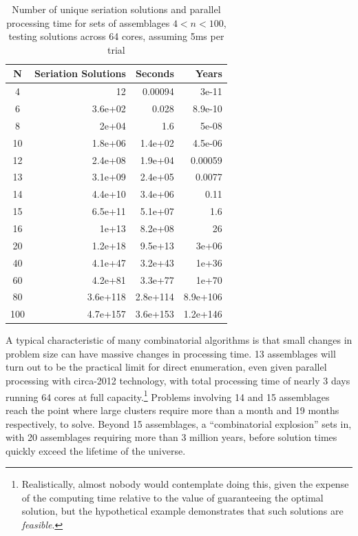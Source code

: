 \documentclass[preprint,times,authoryear,12pt]{els-workingpaper}
\begin{document}
\begin{table}[ht]
\centering
\begin{tabular}{|c|r|r|r|}
  \hline
N & Seriation Solutions & Seconds & Years \\ 
  \hline
  4 &  12 & 0.00094 & 3e-11 \\ 
    6 & 3.6e+02 & 0.028 & 8.9e-10 \\ 
    8 & 2e+04 & 1.6 & 5e-08 \\ 
   10 & 1.8e+06 & 1.4e+02 & 4.5e-06 \\ 
   12 & 2.4e+08 & 1.9e+04 & 0.00059 \\ 
   13 & 3.1e+09 & 2.4e+05 & 0.0077 \\ 
   14 & 4.4e+10 & 3.4e+06 & 0.11 \\ 
   15 & 6.5e+11 & 5.1e+07 & 1.6 \\ 
   16 & 1e+13 & 8.2e+08 &  26 \\ 
   20 & 1.2e+18 & 9.5e+13 & 3e+06 \\ 
   40 & 4.1e+47 & 3.2e+43 & 1e+36 \\ 
   60 & 4.2e+81 & 3.3e+77 & 1e+70 \\ 
   80 & 3.6e+118 & 2.8e+114 & 8.9e+106 \\ 
  100 & 4.7e+157 & 3.6e+153 & 1.2e+146 \\ 
   \hline
\end{tabular}
\caption{Number of unique seriation solutions and parallel processing time for sets of assemblages $4 < n < 100$, testing solutions across 64 cores, assuming 5ms per trial} 
\label{tab:ss-stats}
\end{table}


A typical characteristic of many combinatorial algorithms is that small changes in problem size can have massive changes in processing time.  13 assemblages will turn out to be the practical limit for direct enumeration, even given parallel processing with circa-2012 technology, with total processing time of nearly 3 days running 64 cores at full capacity.\footnote{Realistically, almost nobody would contemplate doing this, given the expense of the computing time relative to the value of guaranteeing the optimal solution, but the hypothetical example demonstrates that such solutions are \emph{feasible}.}  Problems involving 14 and 15 assemblages reach the point where large clusters require more than a month and 19 months respectively, to solve.  Beyond 15 assemblages, a ``combinatorial explosion'' sets in, with 20 assemblages requiring more than 3 million years, before solution times quickly exceed the lifetime of the universe.  
\end{document}
